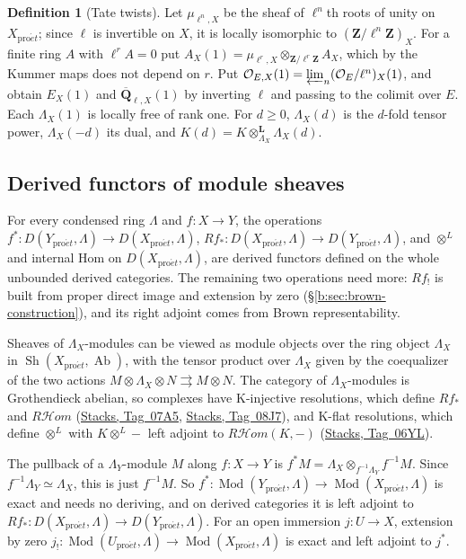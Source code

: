 \documentclass[11pt,a4paper]{article}
\numberwithin{equation}{section}
\theoremstyle{definition}
\newtheorem{definition}[theorem]{Definition}
\theoremstyle{remark}
\newcommand{\cHom}{R\mathcal{H}\!om}
\newcommand{\Sh}{\operatorname{Sh}}
\newcommand{\Mod}{\operatorname{Mod}}
\newcommand{\proet}{\mathrm{pro}\acute{e}t}
\newcommand{\stacks}[1]{\href{https://stacks.math.columbia.edu/tag/#1}{\textnormal{Stacks, Tag~#1}}}
\newcommand{\Ab}{\operatorname{Ab}}
\newcommand{\QbarX}{\overline{\mathbf Q}_{\ell,X}}
\begin{document}
\begin{definition}[Tate twists]\label{def:sp-Tate-twist}
Let $\mu_{\ell^n,X}$ be the sheaf of $\ell^n$th roots of unity on $X_{\proet}$;
since $\ell$ is invertible on $X$, it is locally isomorphic to
$(\mathbf Z/\ell^n\mathbf Z)_X$. For a finite ring $A$ with $\ell^rA=0$ put
$A_X(1)=\mu_{\ell^r,X}\otimes_{\mathbf Z/\ell^r\mathbf Z}A_X$, which by the
Kummer maps does not depend on $r$. Put
$\mathcal O_{E,X}(1)=\varprojlim_n(\mathcal O_E/\ell^n)_X(1)$, and obtain
$E_X(1)$ and $\QbarX(1)$ by inverting $\ell$ and passing to the colimit
over $E$. Each $\Lambda_X(1)$ is locally free of rank one. For $d\ge0$,
$\Lambda_X(d)$ is the $d$-fold tensor power, $\Lambda_X(-d)$ its dual, and
$K(d)=K\otimes^{\mathbf L}_{\Lambda_X}\Lambda_X(d)$.
\end{definition}

\subsection{Derived functors of module sheaves}
\label{n:ambient}
For every condensed ring $\Lambda$ and $f:X\to Y$, the operations
$f^*\colon D(Y_{\proet},\Lambda)\to D(X_{\proet},\Lambda)$,
$Rf_*\colon D(X_{\proet},\Lambda)\to D(Y_{\proet},\Lambda)$, and
$\otimes^L$ and internal Hom on $D(X_{\proet},\Lambda)$, are derived
functors defined on the whole unbounded derived categories. The
remaining two operations need more: $Rf_!$ is built from
proper direct image and extension by zero
(\S\ref{b:sec:brown-construction}), and its right adjoint comes from
Brown representability.

Sheaves of $\Lambda_X$-modules can be viewed as module objects over the
ring object $\Lambda_X$ in $\Sh(X_{\proet},\Ab)$, with the tensor product
over $\Lambda_X$ given by the coequalizer of the two actions
$M\otimes\Lambda_X\otimes N\rightrightarrows M\otimes N$. The category of
$\Lambda_X$-modules is Grothendieck abelian, so complexes have K-injective
resolutions, which define $Rf_*$ and $\cHom$ (\stacks{07A5},
\stacks{08J7}), and K-flat resolutions, which define $\otimes^L$ with
$K\otimes^L-$ left adjoint to $\cHom(K,-)$ (\stacks{06YL}).

The pullback of a $\Lambda_Y$-module $M$ along $f:X\to Y$ is
$f^*M=\Lambda_X\otimes_{f^{-1}\Lambda_Y}f^{-1}M$. Since
$f^{-1}\Lambda_Y\simeq\Lambda_X$, this is just $f^{-1}M$. So $f^*\colon\Mod(Y_{\proet},\Lambda)\to
\Mod(X_{\proet},\Lambda)$ is exact and needs no deriving, and on derived
categories it is left adjoint to $Rf_*\colon D(X_{\proet},\Lambda)\to
D(Y_{\proet},\Lambda)$. For an open immersion $j:U\to X$, extension by
zero $j_!\colon\Mod(U_{\proet},\Lambda)\to\Mod(X_{\proet},\Lambda)$ is
exact and left adjoint to $j^*$.
\end{document}
